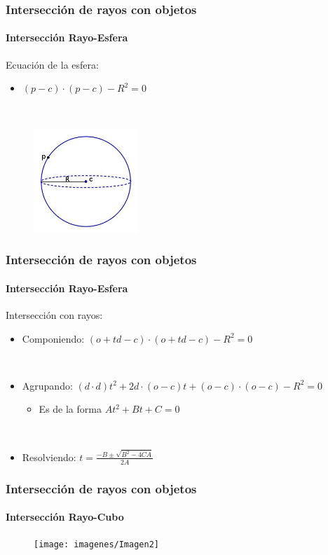 \documentclass{beamer}
\begin{document}
	\begin{frame}
		\frametitle{Intersección de rayos con objetos}
		\framesubtitle{Intersección Rayo-Esfera}
		
		Ecuación de la esfera:
		${ }$\\
		\begin{itemize}
			\item $(p-c)\cdot(p-c) - R^2 = 0$
		\end{itemize}
		${ }$\\
		
		\begin{figure}[h]
				\includegraphics[width=0.35\textwidth]{imagenes/esfera}
		\end{figure}
		
	\end{frame}
	
	\begin{frame}
		\frametitle{Intersección de rayos con objetos}
		\framesubtitle{Intersección Rayo-Esfera}
		
		
		Intersección con rayos:
		${ }$\\
		
		\begin{itemize}
			\item Componiendo: $(o+td-c)\cdot(o+td-c) - R^2 = 0$
			
			${ }$\\
			
			\item Agrupando: $(d\cdot d)t^2 + 2d\cdot (o-c)t + (o-c)\cdot(o-c) - R^2 = 0$
			\begin{itemize}
				\item Es de la forma $At^2+Bt+C=0$
			\end{itemize}
			${ }$\\
			\item Resolviendo: $t = \frac{-B\pm \sqrt{B^2-4CA}}{2A}$
		\end{itemize}
	\end{frame}
	
	\begin{frame}
		\frametitle{Intersección de rayos con objetos}
		\framesubtitle{Intersección Rayo-Cubo}
		
		\begin{figure}[h]
			\texttt{[image: imagenes/Imagen2]}
		\end{figure}
	\end{frame}
	
\end{document}
